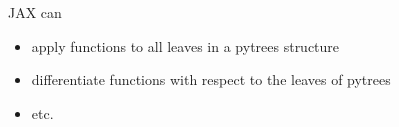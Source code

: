 \documentclass[xcolor=dvipsnames, 10pt]{beamer}
\begin{document}
\begin{frame}
    
    
    \resizebox{0.9\textwidth}{!}{
        
    }

\end{frame}


\begin{frame}
    
    JAX can

    \begin{itemize}
        \item apply functions to all leaves in a pytrees structure
        \vspace{0.5em}
        \item differentiate functions with respect to the leaves of pytrees
        \vspace{0.5em}
        \item etc.
    \end{itemize}


\end{frame}
\end{document}
